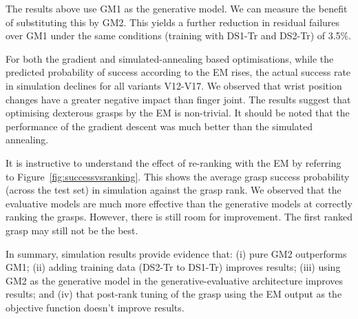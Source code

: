 The results above use GM1 as the generative model. We can measure the benefit of substituting this by GM2. This yields a further reduction in residual failures over GM1 under the same conditions (training with DS1-Tr and DS2-Tr) of 3.5\%.

For both the gradient and simulated-annealing based optimisations, while the predicted probability of success according to the EM rises, the actual success rate in simulation declines for all variants V12-V17. We observed that wrist position changes have a greater negative impact than finger joint. The results suggest that optimising dexterous grasps by the EM is non-trivial. It should be noted that the performance of the gradient descent was much better than the simulated annealing. 

It is instructive to understand the effect of re-ranking with the EM by referring to Figure~\ref{fig:successvsranking}. This shows the average grasp success probability (across the test set) in simulation against the grasp rank. We observed that the evaluative models are much more effective than the generative models at correctly ranking the grasps. However, there is still room for improvement. The first ranked grasp may still not be the best.

In summary, simulation results provide evidence that: (i) pure GM2 outperforms GM1; (ii) adding training data (DS2-Tr to DS1-Tr) improves results; (iii) using GM2 as the generative model in the generative-evaluative architecture improves results; and (iv) that post-rank tuning of the grasp using the EM output as the objective function doesn't improve results.

